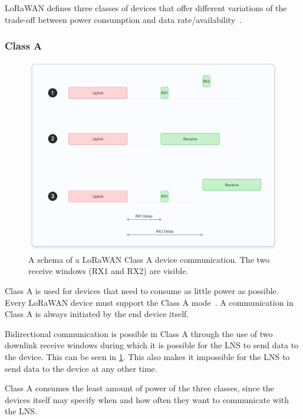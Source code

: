 \ac{LoRaWAN} defines three classes of devices that offer different variations of the trade-off between power consumption and data rate/availability~\cite[p. 10]{lora_alliance_inc_lorawan_2017}.

\subsubsection{Class A}

\begin{figure}[htbp]
    \centering
    \includegraphics[width=1\textwidth]{pictures/device-classes/class-a.png}
    \caption{
        A schema of a \ac{LoRaWAN} Class A device communication.
        The two receive windows (RX1 and RX2) are visible.~\protect\cite{the_things_industries_bv_device_nodate}
    }\label{pic:lorawan-device-class-a-schema}
\end{figure}

Class A is used for devices that need to consume as little power as possible.
Every \ac{LoRaWAN} device must support the Class A mode~\cite[p. 11]{lora_alliance_inc_lorawan_2017}.
A communication in Class A is always initiated by the end device itself.

Bidirectional communication is possible in Class A through the use of two downlink receive windows during which it is possible for the \ac{LNS} to send data to the device.
This can be seen in \cref{pic:lorawan-device-class-a-schema}.
This also makes it impossible for the \ac{LNS} to send data to the device at any other time.

Class A consumes the least amount of power of the three classes, since the devices itself may specify when and how often they want to communicate with the \ac{LNS}.

